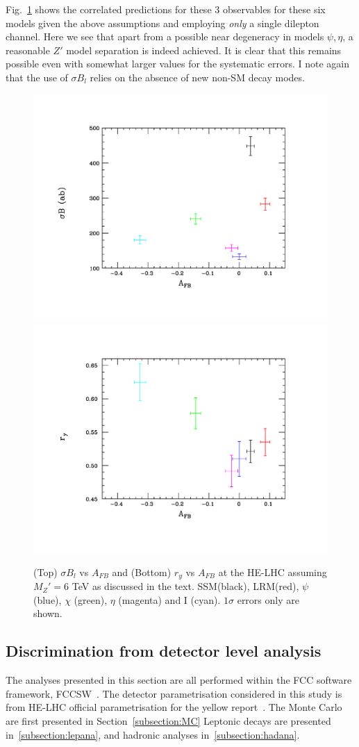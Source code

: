 Fig.~\ref{toy3} shows the correlated predictions for these 3 observables for these six models given the above assumptions and employing {\it only} a single dilepton 
channel. Here we see that apart from a possible near degeneracy in models $\psi,\eta$, a reasonable $Z'$ model separation is indeed achieved. It is clear that this 
remains possible even with somewhat larger values for the systematic errors. I note again that the use of $\sigma B_l$ relies on the absence of new non-SM decay 
modes.



\begin{figure}[htbp]
  \centering
\includegraphics[trim={2cm 2cm 2cm 2cm},clip,width=0.49\columnwidth]{Fig/compare2.pdf}
\includegraphics[trim={2cm 2cm 2cm 2cm},clip,width=0.49\columnwidth]{Fig/compare3.pdf}
\caption{(Top) $\sigma B_l$ vs $A_{FB}$ and (Bottom) $r_y$ vs $A_{FB}$ at the HE-LHC assuming $M_Z'=6$ TeV as discussed in the text. 
SSM(black), LRM(red), $\psi$ (blue), $\chi$ (green), $\eta$ (magenta) and I (cyan). $1\sigma$ errors only are shown. }
\label{toy3}
\end{figure}




\subsection{Discrimination from detector level analysis}
The analyses presented in this section are all performed within the FCC software framework, FCCSW~\cite{fccsw_web}.
The detector parametrisation considered in this study is from HE-LHC official parametrisation for the yellow report~\cite{hlhelhc_web}.
The Monte Carlo are first presented in Section~\ref{subsection:MC} Leptonic decays are presented in~\ref{subsection:lepana}, and hadronic analyses in~\ref{subsection:hadana}.


